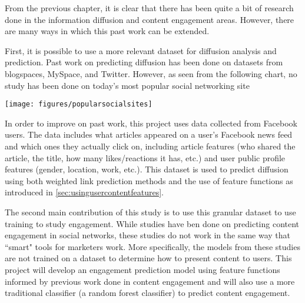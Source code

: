 From the previous chapter, it is clear that there has been quite a bit of research done in the information diffusion and content engagement areas.  However, there are many ways in which this past work can be extended.  

First, it is possible to use a more relevant dataset for diffusion analysis and prediction.  Past work on predicting diffusion has been done on datasets from blogspaces, MySpace, and Twitter.  However, as seen from the following chart, no study has been done on today's most popular social networking site \cite{socialsites}

\begin{center}
	\texttt{[image: figures/popularsocialsites]}
\end{center}

In order to improve on past work, this project uses data collected from Facebook users.  The data includes what articles appeared on a user's Facebook news feed and which ones they actually click on, including article features (who shared the article, the title, how many likes/reactions it has, etc.) and user public profile features (gender, location, work, etc.).  This dataset is used to predict diffusion using both weighted link prediction methods and the use of feature functions as introduced in \ref{sec:usingusercontentfeatures}.

The second main contribution of this study is to use this granular dataset to use training to study engagement.  While studies have ben done on predicting content engagement in social networks, these studies do not work in the same way that ``smart" tools for marketers work.  More specifically, the models from these studies are not trained on a dataset to determine how to present content to users.  This project will develop an engagement prediction model using feature functions informed by previous work done in content engagement and will also use a more traditional classifier (a random forest classifier) to predict content engagement.